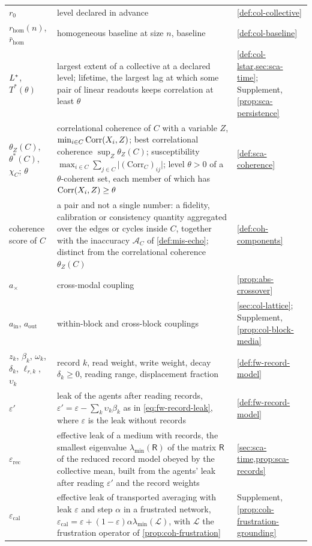 \begin{longtable}{@{}>{\raggedright\arraybackslash}p{}>{\raggedright\arraybackslash}p{}>{\raggedright\arraybackslash}p{}@{}}
$r_0$ & level declared in advance & \cref{def:col-collective}\\
$r_{\mathrm{hom}}(n)$, $\bar r_{\mathrm{hom}}$ & homogeneous baseline at size $n$, baseline & \cref{def:col-baseline}\\
$L^{\ast}$, $T^\ast(\theta)$ & largest extent of a collective at a declared level; lifetime, the largest lag at which some pair of linear readouts keeps correlation at least $\theta$ & \cref{def:col-lstar,sec:sca-time}; Supplement, \cref{prop:sca-persistence}\\
$\theta_Z(C)$, $\theta^\ast(C)$, $\chi_C$; $\theta$ & correlational coherence of $C$ with a variable $Z$, $\min_{i\in C}\operatorname{Corr}(X_i,Z)$; best correlational coherence $\sup_Z\theta_Z(C)$; susceptibility $\max_{i\in C}\sum_{j\in C}\lvert(\mathrm{Corr}_C)_{ij}\rvert$; level $\theta>0$ of a $\theta$-coherent set, each member of which has $\operatorname{Corr}(X_i,Z)\ge\theta$ & \cref{def:sca-coherence}\\
coherence score of $C$ & a pair and not a single number: a fidelity, calibration or consistency quantity aggregated over the edges or cycles inside $C$, together with the inaccuracy $\mathcal A_C$ of \cref{def:mis-echo}; distinct from the correlational coherence $\theta_Z(C)$ & \cref{def:coh-components}\\
$a_\times$ & cross-modal coupling & \cref{prop:abs-crossover}\\
$a_{\mathrm{in}}$, $a_{\mathrm{out}}$ & within-block and cross-block couplings & \cref{sec:col-lattice}; Supplement, \cref{prop:col-block-media}\\
$z_k$, $\beta_k$, $\omega_k$, $\delta_k$, $\ell_{r,k}$, $\upsilon_k$ & record $k$, read weight, write weight, decay $\delta_k\ge0$, reading range, displacement fraction &\cref{def:fw-record-model}\\
$\varepsilon'$ & leak of the agents after reading records, $\varepsilon'=\varepsilon-\sum_k\upsilon_k\beta_k$ as in \eqref{eq:fw-record-leak}, where $\varepsilon$ is the leak without records & \cref{def:fw-record-model}\\
$\varepsilon_{\mathrm{rec}}$ & effective leak of a medium with records, the smallest eigenvalue $\lambda_{\min}(\mathsf R)$ of the matrix $\mathsf R$ of the reduced record model obeyed by the collective mean, built from the agents' leak after reading $\varepsilon'$ and the record weights & \cref{sec:sca-time,prop:sca-records}\\
$\varepsilon_{\mathrm{cal}}$ & effective leak of transported averaging with leak $\varepsilon$ and step $\alpha$ in a frustrated network, $\varepsilon_{\mathrm{cal}}=\varepsilon+(1-\varepsilon)\alpha\lambda_{\min}(\mathcal L)$, with $\mathcal L$ the frustration operator of \cref{prop:coh-frustration} & Supplement, \cref{prop:coh-frustration-grounding}\\

\end{longtable}

